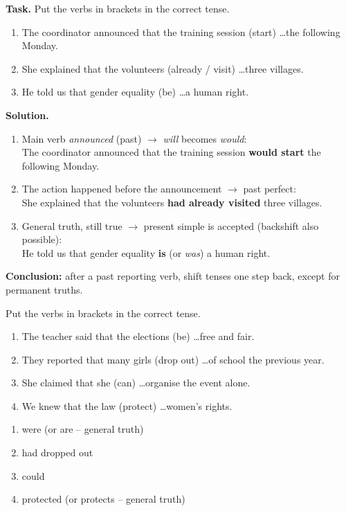 \documentclass[11pt]{article}
\begin{document}
\begin{exoresolu}
\textbf{Task.} Put the verbs in brackets in the correct tense.
\begin{enumerate}
\item The coordinator announced that the training session (start) \ldots the following Monday.
\item She explained that the volunteers (already / visit) \ldots three villages.
\item He told us that gender equality (be) \ldots a human right.
\end{enumerate}
\tcblower
\textbf{Solution.}
\begin{enumerate}
\item Main verb \emph{announced} (past) $\rightarrow$ \emph{will} becomes \emph{would}: \\
The coordinator announced that the training session \textbf{would start} the following Monday.
\item The action happened before the announcement $\rightarrow$ past perfect: \\
She explained that the volunteers \textbf{had already visited} three villages.
\item General truth, still true $\rightarrow$ present simple is accepted (backshift also possible): \\
He told us that gender equality \textbf{is} (or \emph{was}) a human right.
\end{enumerate}
\textbf{Conclusion:} after a past reporting verb, shift tenses one step back, except for permanent truths.
\end{exoresolu}

\begin{exercice}
Put the verbs in brackets in the correct tense.
\begin{enumerate}
\item The teacher said that the elections (be) \ldots free and fair.
\item They reported that many girls (drop out) \ldots of school the previous year.
\item She claimed that she (can) \ldots organise the event alone.
\item We knew that the law (protect) \ldots women's rights.
\end{enumerate}
\end{exercice}

\begin{corrige}
\begin{enumerate}
\item were (or are -- general truth)
\item had dropped out
\item could
\item protected (or protects -- general truth)
\end{enumerate}
\end{corrige}
\end{document}
